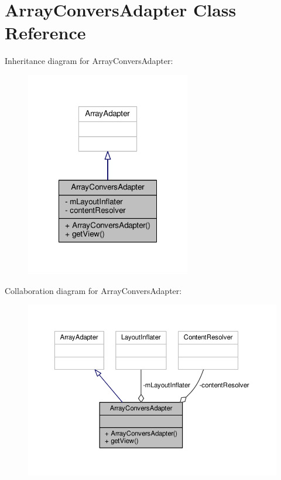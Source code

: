 \hypertarget{a00003}{\section{Array\+Convers\+Adapter Class Reference}
\label{a00003}
}


Inheritance diagram for Array\+Convers\+Adapter\+:
\nopagebreak
\begin{figure}[H]
\begin{center}
\leavevmode
\includegraphics[width=204pt]{a00065}
\end{center}
\end{figure}


Collaboration diagram for Array\+Convers\+Adapter\+:
\nopagebreak
\begin{figure}[H]
\begin{center}
\leavevmode
\includegraphics[width=350pt]{a00066}
\end{center}
\end{figure}

